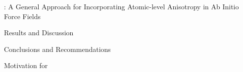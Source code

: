 \begin{chapter}{\mastiff: A General Approach for Incorporating Atomic-level
Anisotropy in Ab Initio Force Fields}
\begin{section}{Results and Discussion}
\end{section}





\begin{section}{Conclusions and Recommendations}
\label{sec:conclusions}



\end{section}


\begin{subappendices}
\begin{section}{Motivation for \gij}
\label{sec:appendix}



\end{section}

\end{subappendices}

\end{chapter}

